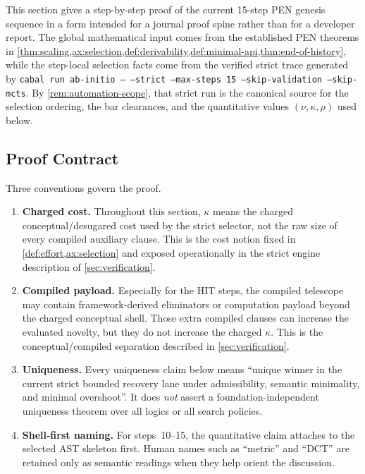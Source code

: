 \documentclass[11pt,a4paper]{article}
\theoremstyle{plain}
\theoremstyle{definition}
\theoremstyle{remark}
\begin{document}
This section gives a step-by-step proof of the current 15-step PEN genesis
sequence in a form intended for a journal proof spine rather than for a
developer report.
The global mathematical input comes from the established PEN theorems in
\cref{thm:scaling,ax:selection,def:derivability,def:minimal-api,thm:end-of-history},
while the step-local selection facts come from the verified strict trace
generated by
\texttt{cabal run ab-initio -- --strict --max-steps 15 --skip-validation --skip-mcts}.
By \cref{rem:automation-scope}, that strict run is the canonical source for the
selection ordering, the bar clearances, and the quantitative values
$(\nu,\kappa,\rho)$ used below.

\let\genesissequenceorigparagraph\paragraph
\renewcommand{\paragraph}[1]{\par\medskip\noindent\textbf{#1.}\ }

\subsection{Proof Contract}
\label{subsec:genesis-proof-contract}

Three conventions govern the proof.

\begin{enumerate}[nosep]
    \item \textbf{Charged cost.} Throughout this section, $\kappa$ means the
    charged conceptual/desugared cost used by the strict selector, not the raw
    size of every compiled auxiliary clause.
    This is the cost notion fixed in \cref{def:effort,ax:selection} and exposed
    operationally in the strict engine description of
    \cref{sec:verification}.
    \item \textbf{Compiled payload.} Especially for the HIT steps, the compiled
    telescope may contain framework-derived eliminators or computation payload
    beyond the charged conceptual shell.
    Those extra compiled clauses can increase the evaluated novelty, but they do
    not increase the charged $\kappa$.
    This is the conceptual/compiled separation described in
    \cref{sec:verification}.
    \item \textbf{Uniqueness.} Every uniqueness claim below means
    ``unique winner in the current strict bounded recovery lane under admissibility,
    semantic minimality, and minimal overshoot''.
    It does \emph{not} assert a foundation-independent uniqueness theorem over
    all logics or all search policies.
    \item \textbf{Shell-first naming.} For steps~10--15, the quantitative claim
    attaches to the selected AST skeleton first.
    Human names such as ``metric'' and ``DCT'' are retained only as semantic
    readings when they help orient the discussion.
\end{enumerate}
\end{document}
